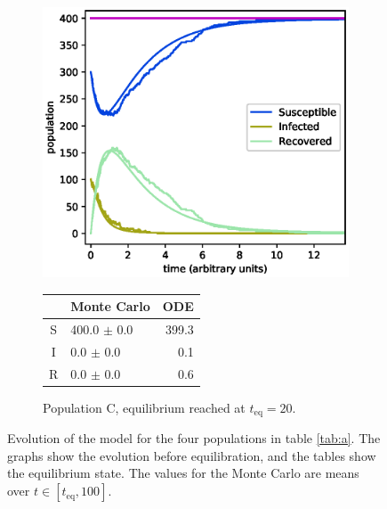 \documentclass[a4paper,10pt,twocolumn]{article}
\begin{document}
\begin{figure}
\begin{subfigure}{.5\textwidth}
	\includegraphics[width=\linewidth]{a4b4c05_1.eps}
	\small
	\begin{tabular}{c l r}
   &    Monte Carlo     &  ODE  \\\hline
S &  400.0 $\pm$   0.0 &  399.3 \\
I &    0.0 $\pm$   0.0 &    0.1 \\
R &    0.0 $\pm$   0.0 &    0.6 \\\hline
	\end{tabular}
	\caption{Population C, equilibrium reached at $t_\mathrm{eq}=20$.}
	\label{fig:aD}
\end{subfigure}
	\caption{Evolution of the model for the four populations in table \ref{tab:a}. The graphs show the evolution before equilibration, and the tables show the equilibrium state. The values for the Monte Carlo are means over $t\in[t_\mathrm{eq},100]$.}
	\label{fig:a} 
\end{figure}
\end{document}
